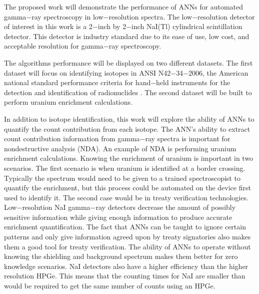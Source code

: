 \documentclass[tocnosub,noragright,centerchapter,12pt,fullpage]{uiucecethesis09}
\begin{document}
The proposed work will demonstrate the performance of ANNs for automated gamma$-$ray spectroscopy in low$-$resolution spectra. The low$-$resolution detector of interest in this work is a 2$-$inch by 2$-$inch NaI(Tl) cylindrical scintillation detector. This detector is industry standard due to its ease of use, low cost, and acceptable resolution for gamma$-$ray spectroscopy. 

The algorithms performance will be displayed on two different datasets. The first dataset will focus on identifying isotopes in ANSI N42$-$34$-$2006, the American national standard performance criteria for hand$-$held instruments for the detection and identification of radionuclides \cite{ANSI}. The second dataset will be built to perform uranium enrichment calculations.



In addition to isotope identification, this work will explore the ability of ANNs to quantify the count contribution from each isotope. The ANN's ability to extract count contribution information from gamma$-$ray spectra is important for nondestructive analysis (NDA). An example of NDA is performing uranium enrichment calculations. Knowing the enrichment of uranium is important in two scenarios. The first scenario is when uranium is identified at a border crossing. Typically the spectrum would need to be given to a trained spectroscopist to quantify the enrichment, but this process could be automated on the device first used to identify it. The second case would be in treaty verification technologies. Low$-$resolution NaI gamma$-$ray detectors decrease the amount of possibly sensitive information while giving enough information to produce accurate enrichment quantification. The fact that ANNs can be taught to ignore certain patterns and only give information agreed upon by treaty signatories also makes them a good tool for treaty verification. The ability of ANNs to operate without knowing the shielding and background spectrum makes them better for zero knowledge scenarios. NaI detectors also have a higher efficiency than the higher resolution HPGe. This means that the counting times for NaI are smaller than would be required to get the same number of counts using an HPGe.    
\end{document}
